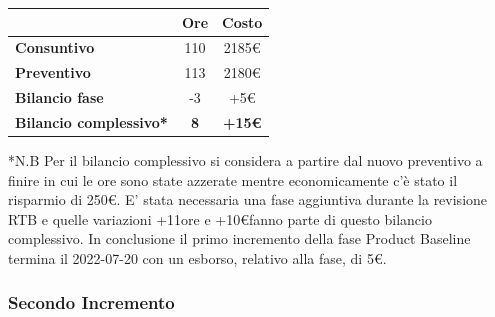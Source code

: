 \begin{center}
	\renewcommand{\arraystretch}{1.8}
	\begin{tabular}{ | l |c|c| }
    \hline
    & \textbf{Ore} & \textbf{Costo} \\
	\hline
    \textbf{Consuntivo} & 110 & 2185\euro \\
    \hline
    \textbf{Preventivo} & 113 & 2180\euro \\
    \hline
    \textbf{Bilancio fase} & -3 & +5\euro \\
    \hline
    \textbf{Bilancio complessivo*} & \textbf{8} & \textbf{+15\euro} \\
    \hline
    \end{tabular}
\end{center}
*N.B Per il bilancio complessivo si considera a partire dal nuovo preventivo a finire in cui le ore sono state azzerate mentre economicamente c'è stato il risparmio di 250\euro.
E' stata necessaria una fase aggiuntiva durante la revisione RTB e quelle variazioni +11ore e +10\euro fanno parte di questo bilancio complessivo. \newline
In conclusione il primo incremento della fase Product Baseline termina il 2022-07-20 con un esborso, relativo
alla fase, di 5€.

\newpage

\subsubsection{Secondo Incremento}

